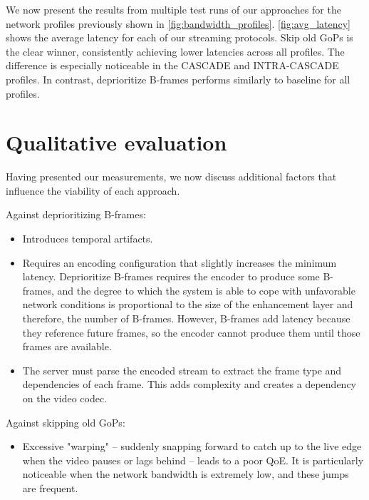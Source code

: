 We now present the results from multiple test runs of our approaches for the network profiles previously shown in \autoref{fig:bandwidth_profiles}. \autoref{fig:avg_latency} shows the average latency for each of our streaming protocols. Skip old GoPs is the clear winner, consistently achieving lower latencies across all profiles. The difference is especially noticeable in the CASCADE and INTRA-CASCADE profiles. In contrast, deprioritize B-frames performs similarly to baseline for all profiles. %

\section{Qualitative evaluation}
Having presented our measurements, we now discuss additional factors that influence the viability of each approach.

Against deprioritizing B-frames:
\begin{itemize}
    \item Introduces temporal artifacts.
    \item Requires an encoding configuration that slightly increases the minimum latency. Deprioritize B-frames requires the encoder to produce some B-frames, and the degree to which the system is able to cope with unfavorable network conditions is proportional to the size of the enhancement layer and therefore, the number of B-frames. However, B-frames add latency because they reference future frames, so the encoder cannot produce them until those frames are available.
    \item The server must parse the encoded stream to extract the frame type and dependencies of each frame. This adds complexity and creates a dependency on the video codec.
\end{itemize}

Against skipping old GoPs:
\begin{itemize}
    \item Excessive "warping" -- suddenly snapping forward to catch up to the live edge when the video pauses or lags behind -- leads to a poor QoE. It is particularly noticeable when the network bandwidth is extremely low, and these jumps are frequent.
\end{itemize}